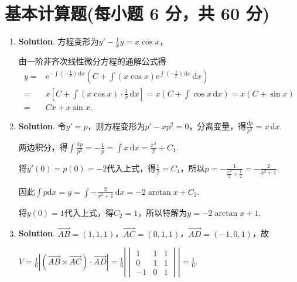 \documentclass[../main.tex]{subfiles}
\begin{document}
\section{基本计算题(每小题 6 分，共 60 分)}
\begin{enumerate}
    \item \textbf{Solution}. 方程变形为$y'-\frac{1}{x}y=x\cos x$，

          由一阶非齐次线性微分方程的通解公式得
          \[
              \begin{aligned}
                  y = {} & \mathrm{e}^{-\int\left(-\frac{1}{x}\right)\,\mathrm{d}x}\left(C+\int\left(x\cos x\right)\mathrm{e}^{\int\left(-\frac{1}{x}\right)\,\mathrm{d}x}\,\mathrm{d}x\right) \\
                  = {}   & x\left[C+\int\left(x\cos x\right)\cdot\frac{1}{x}\,\mathrm{d}x\right] = x\left(C+\int\cos x\,\mathrm{d}x\right) = x(C+\sin x)                                       \\
                  = {}   & Cx+x\sin x.
              \end{aligned}
          \]

    \item \textbf{Solution}. 令$y'=p$，则方程变形为$p'-xp^{2}=0$，分离变量，得$\frac{\mathrm{d}p}{p^{2}}
              =x\,\mathrm{d}x$.

          两边积分，得$\int\frac{\mathrm{d}p}{p^{2}}=-\frac{1}{p}=\int x\,\mathrm{d}x=\frac{x^{2}}{2}
              +C_{1}$.

          将$y'(0)=p(0)=-2$代入上式，得$\frac{1}{2}=C_{1}$，所以$p=-\frac{1}{\frac{x^{2}}{2}+\frac{1}{2}}
              =-\frac{2}{x^{2}+1}$.

          因此$\int p \mathrm{d}x =y = \int -\frac{2}{x^{2}+1}\,\mathrm{d}x = -2\arctan
              x + C_{2}$.

          将$y(0)=1$代入上式，得$C_{2}=1$，所以特解为$y=-2\arctan x + 1$.

    \item \textbf{Solution}. $\overrightarrow{AB}= (1,1,1)$，$\overrightarrow{AC}
              = (0,1,1)$，$\overrightarrow{AD}= (-1,0,1)$，故

          $V=\frac{1}{6}\left|\left(\overrightarrow{AB}\times\overrightarrow{AC}\right
              )\cdot \overrightarrow{AD}\right| = \frac{1}{6}\left|
              \begin{vmatrix}
                  1  & 1 & 1 \\
                  0  & 1 & 1 \\
                  -1 & 0 & 1
              \end{vmatrix}\right| = \frac{1}{6}.$


\end{enumerate}
\end{document}
